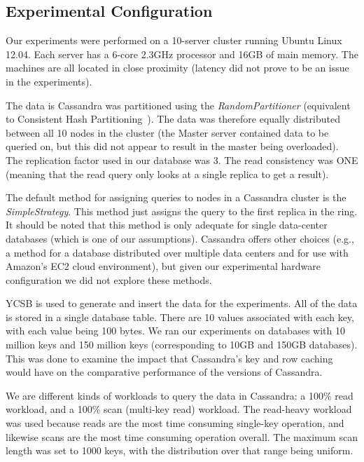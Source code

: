\documentclass[]{acm_proc_article-sp}
\begin{document}
\subsection{Experimental Configuration}
Our experiments were performed on a 10-server cluster running Ubuntu Linux 12.04. Each server has a 6-core 2.3GHz processor and 16GB of main memory. The machines are all located in close proximity (latency did not prove to be an issue in the experiments).

The data is Cassandra was partitioned using the \textit{RandomPartitioner} (equivalent to Consistent Hash Partitioning~\cite{http://www.paperplanes.de/2011/12/9/the-magic-of-consistent-hashing.html}). The data was therefore equally distributed between all 10 nodes in the cluster (the Master server contained data to be queried on, but this did not appear to result in the master being overloaded). The replication factor used in our database was 3. The read consistency was ONE (meaning that the read query only looks at a single replica to get a result).

The default method for assigning queries to nodes in a Cassandra cluster is the \textit{SimpleStrategy}. This method just assigns the query to the first replica in the ring. It should be noted that this method is only adequate for single data-center databases (which is one of our assumptions). Cassandra offers other choices (e.g., a method for a database distributed over multiple data centers and for use with Amazon’s EC2 cloud environment), but given our experimental hardware configuration we did not explore these methods.

YCSB is used to generate and insert the data for the experiments. All of the data is stored in a single database table. There are 10 values associated with each key, with each value being 100 bytes. We ran our experiments on databases with 10 million keys and 150 million keys (corresponding to 10GB and 150GB databases). This was done to examine the impact that Cassandra’s key and row caching would have on the comparative performance of the versions of Cassandra.

We are different kinds of workloads to query the data in Cassandra: a 100\% read workload, and a 100\% scan (multi-key read) workload. The read-heavy workload was used because reads are the most time consuming single-key operation, and likewise scans are the most time consuming operation overall. The maximum scan length was set to 1000 keys, with the distribution over that range being uniform.
\end{document}
